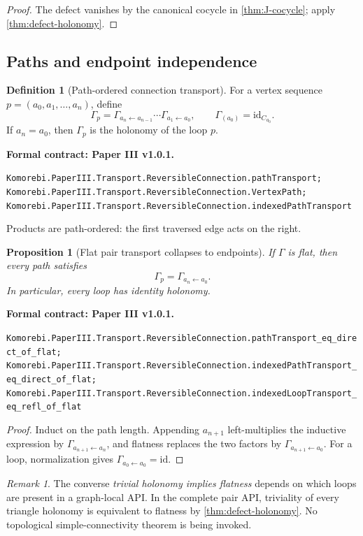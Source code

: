 \documentclass[11pt,a4paper]{article}
\theoremstyle{plain}
\newtheorem{proposition}[proposition]{Proposition}
\theoremstyle{definition}
\newtheorem{definition}[definition]{Definition}
\theoremstyle{remark}
\newtheorem{remark}[remark]{Remark}
\newcommand{\id}{\mathrm{id}}
\newcommand{\leanname}[1]{\nolinkurl{#1}}
\newcommand{\statusleanthree}[1]{\par\smallskip\noindent\begin{minipage}{\linewidth}{\color{leanblue}\textbf{Formal contract: Paper III v1.0.1.}}\par\begingroup\small\raggedright\leanname{#1}\par\endgroup\end{minipage}\par\smallskip}
\begin{document}
\begin{proof}
The defect vanishes by the canonical cocycle in
\cref{thm:J-cocycle}; apply \cref{thm:defect-holonomy}.
\end{proof}

\subsection{Paths and endpoint independence}

\begin{definition}[Path-ordered connection transport]
\label{def:path-transport}
For a vertex sequence
$p=(a_0,a_1,\ldots,a_n)$, define
\[
\Gamma_p
=
\Gamma_{a_n\leftarrow a_{n-1}}\cdots
\Gamma_{a_1\leftarrow a_0},
\qquad
\Gamma_{(a_0)}=\id_{C_{a_0}}.
\]
If $a_n=a_0$, then $\Gamma_p$ is the holonomy of the loop $p$.
\end{definition}
\statusleanthree{Komorebi.PaperIII.Transport.ReversibleConnection.pathTransport; Komorebi.PaperIII.Transport.ReversibleConnection.VertexPath; Komorebi.PaperIII.Transport.ReversibleConnection.indexedPathTransport}

Products are path-ordered: the first traversed edge acts on the right.

\begin{proposition}[Flat pair transport collapses to endpoints]
\label{prop:flat-endpoints}
If $\Gamma$ is flat, then every path satisfies
\[
\Gamma_p=\Gamma_{a_n\leftarrow a_0}.
\]
In particular, every loop has identity holonomy.
\end{proposition}
\statusleanthree{Komorebi.PaperIII.Transport.ReversibleConnection.pathTransport_eq_direct_of_flat; Komorebi.PaperIII.Transport.ReversibleConnection.indexedPathTransport_eq_direct_of_flat; Komorebi.PaperIII.Transport.ReversibleConnection.indexedLoopTransport_eq_refl_of_flat}

\begin{proof}
Induct on the path length.  Appending $a_{n+1}$ left-multiplies the
inductive expression by $\Gamma_{a_{n+1}\leftarrow a_n}$, and flatness
replaces the two factors by
$\Gamma_{a_{n+1}\leftarrow a_0}$.  For a loop, normalization gives
$\Gamma_{a_0\leftarrow a_0}=\id$.
\end{proof}

\begin{remark}
The converse \emph{trivial holonomy implies flatness} depends on which loops
are present in a graph-local API.  In the complete pair API, triviality of
every triangle holonomy is equivalent to flatness by
\cref{thm:defect-holonomy}.  No topological simple-connectivity theorem is
being invoked.
\end{remark}
\end{document}
